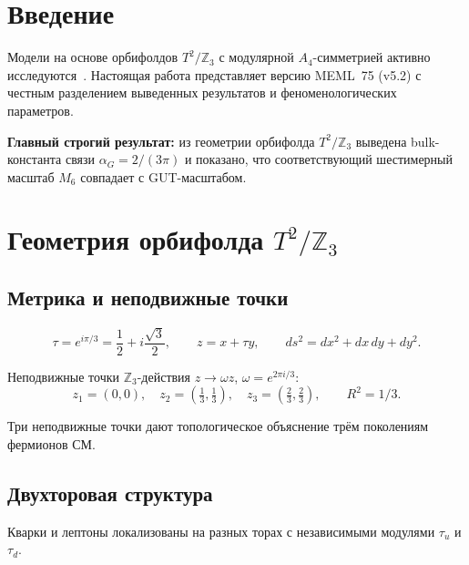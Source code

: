 \documentclass[12pt,a4paper]{article}
\numberwithin{equation}{section}
\begin{document}
\tableofcontents

\section{Введение}

Модели на основе орбифолдов $T^2/\mathbb{Z}_3$ с модулярной 
$A_4$-симметрией активно исследуются~\cite{Feruglio2017,Kobayashi2019}. 
Настоящая работа представляет версию MEML~75 (v5.2) с честным 
разделением выведенных результатов и феноменологических параметров.

\textbf{Главный строгий результат:} из геометрии орбифолда 
$T^2/\mathbb{Z}_3$ выведена bulk-константа связи 
$\alpha_G = 2/(3\pi)$ и показано, что соответствующий 
шестимерный масштаб $M_6$ совпадает с GUT-масштабом.

\section{Геометрия орбифолда $T^2/\mathbb{Z}_3$}

\subsection{Метрика и неподвижные точки}

\begin{equation}
\tau = e^{i\pi/3} = \frac{1}{2} + i\frac{\sqrt3}{2}, \qquad 
z = x + \tau y, \qquad ds^2 = dx^2 + dx\,dy + dy^2.
\end{equation}

Неподвижные точки $\mathbb{Z}_3$-действия $z \to \omega z$, 
$\omega = e^{2\pi i/3}$:
\begin{equation}
z_1 = (0,0), \quad z_2 = \left(\tfrac13,\tfrac13\right), \quad 
z_3 = \left(\tfrac23,\tfrac23\right), \qquad R^2 = 1/3.
\end{equation}

Три неподвижные точки дают топологическое объяснение трём 
поколениям фермионов СМ.

\subsection{Двухторовая структура}

Кварки и лептоны локализованы на разных торах с независимыми 
модулями $\tau_u$ и $\tau_d$.
\end{document}
